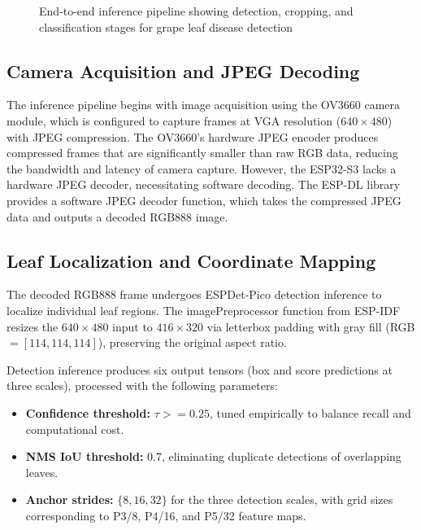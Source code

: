 \begin{figure}[htbp]
\caption{End-to-end inference pipeline showing detection, cropping, and classification stages for grape leaf disease detection}
\label{fig:inference_flow}
\end{figure}




\subsection{Camera Acquisition and JPEG Decoding}
\label{subsec:camera_acquisition}
The inference pipeline begins with image acquisition using the OV3660 camera module, which is configured to capture frames at VGA resolution ($640 \times 480$) with JPEG compression. The OV3660's hardware JPEG encoder produces compressed frames that are significantly smaller than raw RGB data, reducing the bandwidth and latency of camera capture. However, the ESP32-S3 lacks a hardware JPEG decoder, necessitating software decoding. The ESP-DL library provides a software JPEG decoder function, which takes the compressed JPEG data and outputs a decoded RGB888 image.

\subsection{Leaf Localization and Coordinate Mapping}
\label{subsec:leaf_detection_deployment}

The decoded RGB888 frame undergoes ESPDet-Pico detection inference to localize individual leaf regions. The imagePreprocessor function from ESP-IDF resizes the $640 \times 480$ input to $416 \times 320$ via letterbox padding with gray fill (RGB$=[114, 114, 114]$), preserving the original aspect ratio. 


Detection inference produces six output tensors (box and score predictions at three scales), processed with the following parameters: 
 
\begin{itemize}
    \item \textbf{Confidence threshold:} $\tau >= 0.25$, tuned empirically to balance recall and computational cost.
    \item \textbf{NMS IoU threshold:} 0.7, eliminating duplicate detections of overlapping leaves.
    \item \textbf{Anchor strides:} $\{8, 16, 32\}$ for the three detection scales, with grid sizes corresponding to P3/8, P4/16, and P5/32 feature maps.
\end{itemize}

